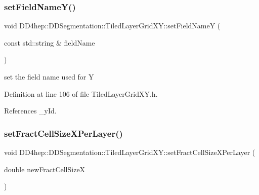 \hypertarget{class_d_d4hep_1_1_d_d_segmentation_1_1_tiled_layer_grid_x_y_a8e33e4196b585e5376e871818e784bfa}{}\label{class_d_d4hep_1_1_d_d_segmentation_1_1_tiled_layer_grid_x_y_a8e33e4196b585e5376e871818e784bfa} 
\subsubsection{\texorpdfstring{set\+Field\+Name\+Y()}{setFieldNameY()}}
{\footnotesize\ttfamily void D\+D4hep\+::\+D\+D\+Segmentation\+::\+Tiled\+Layer\+Grid\+X\+Y\+::set\+Field\+NameY (\begin{DoxyParamCaption}\item[{const std\+::string \&}]{field\+Name }\end{DoxyParamCaption})\hspace{0.3cm}{\ttfamily [inline]}}



set the field name used for Y 



Definition at line 106 of file Tiled\+Layer\+Grid\+X\+Y.\+h.



References \+\_\+y\+Id.

\hypertarget{class_d_d4hep_1_1_d_d_segmentation_1_1_tiled_layer_grid_x_y_a89afa525c07a985c490e593f84961d7c}{}\label{class_d_d4hep_1_1_d_d_segmentation_1_1_tiled_layer_grid_x_y_a89afa525c07a985c490e593f84961d7c} 
\subsubsection{\texorpdfstring{set\+Fract\+Cell\+Size\+X\+Per\+Layer()}{setFractCellSizeXPerLayer()}}
{\footnotesize\ttfamily void D\+D4hep\+::\+D\+D\+Segmentation\+::\+Tiled\+Layer\+Grid\+X\+Y\+::set\+Fract\+Cell\+Size\+X\+Per\+Layer (\begin{DoxyParamCaption}\item[{double}]{new\+Fract\+Cell\+SizeX }\end{DoxyParamCaption})\hspace{0.3cm}{\ttfamily [inline]}}



